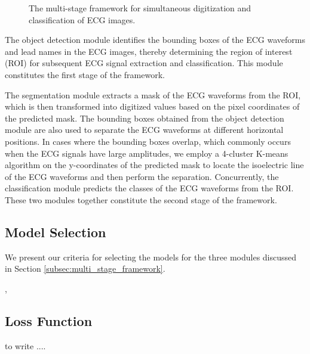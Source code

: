 \begin{figure*}[!t]
\centering

\caption{The multi-stage framework for simultaneous digitization and classification of ECG images.}
\label{fig:multi-stage-framework}
\end{figure*}

The object detection module identifies the bounding boxes of the ECG waveforms and lead names in the ECG images, thereby determining the region of interest (ROI) for subsequent ECG signal extraction and classification. This module constitutes the first stage of the framework.

The segmentation module extracts a mask of the ECG waveforms from the ROI, which is then transformed into digitized values based on the pixel coordinates of the predicted mask. The bounding boxes obtained from the object detection module are also used to separate the ECG waveforms at different horizontal positions. In cases where the bounding boxes overlap, which commonly occurs when the ECG signals have large amplitudes, we employ a 4-cluster K-means algorithm on the y-coordinates of the predicted mask to locate the isoelectric line of the ECG waveforms and then perform the separation. Concurrently, the classification module predicts the classes of the ECG waveforms from the ROI. These two modules together constitute the second stage of the framework.

\subsection{Model Selection}
\label{subsec:model_selection}


We present our criteria for selecting the models for the three modules discussed in Section \ref{subsec:multi_stage_framework}.

\cite{Liu_2022_ConvNeXt}

\cite{carion2020DETR}, \cite{resnet}

\cite{unet}

\subsection{Loss Function}
\label{subsec:loss_function}

\cite{wolf-etal-2020-transformers}

to write .... \cite{torch_ecg_paper}
